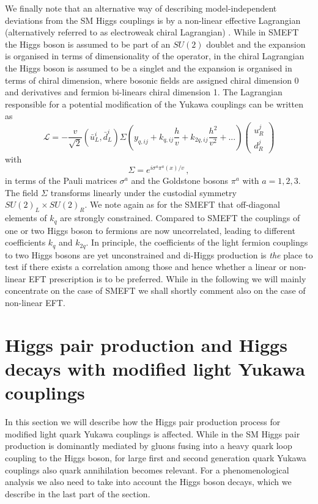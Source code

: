 \par
We finally note that an alternative way of describing model-independent deviations from the SM Higgs couplings is by a non-linear effective Lagrangian (alternatively referred to as electroweak chiral Lagrangian) \cite{Coleman:1969sm, Callan:1969sn}.  While in SMEFT the Higgs boson is assumed to be part of an $SU(2)$ doublet and the expansion is
organised in terms of dimensionality of the operator, in the chiral Lagrangian the Higgs boson is assumed to be a singlet and the expansion is organised in terms
of chiral dimension, where bosonic fields are assigned chiral dimension 0 and derivatives and fermion bi-linears chiral dimension 1.
The Lagrangian responsible for a potential modification of the Yukawa couplings can be written as \cite{Contino:2010mh}
\begin{equation}
	\mathcal{L}=-\frac{v}{\sqrt{2}}(\bar{u}_L^i, \bar{d}_L^i)\Sigma \left( y_{q,ij}+ k_{q,ij} \frac{h}{v}+k_{2q,ij}\frac{h^2}{v^2}+...\right)\left(\begin{array}{c} u_R^j \\ d_R^j\end{array}\right)
	\label{chirallag}
\end{equation}
with
\begin{equation}
	\Sigma=e^{i\sigma^a \pi^a(x)/v}\,,
\end{equation}
in terms of the Pauli matrices $\sigma^a$ and the Goldstone bosons $\pi^a$ with $a=1,2,3$. The field $\Sigma$ transforms linearly under the custodial symmetry $SU(2)_L\times SU(2)_R$. We note again as for the SMEFT that off-diagonal elements of $k_{q}$ are strongly constrained. Compared to SMEFT the couplings of one or two Higgs boson to fermions are now uncorrelated, leading to different coefficients $k_{q}$ and $k_{2q}$.
In principle, the coefficients of the light fermion couplings to two Higgs bosons are yet unconstrained and di-Higgs production is \textit{the} place to test if there exists a correlation among those and hence whether a linear or non-linear EFT prescription is to be preferred.
While in the following we will mainly concentrate on the case of SMEFT we shall shortly comment also on the case of non-linear EFT.
\section{Higgs pair production and Higgs decays with modified light Yukawa couplings \label{sec:HH}}
In this section we will describe how the Higgs pair production process for modified light quark Yukawa couplings is affected.
While in the SM Higgs pair production is dominantly mediated by gluons fusing into a heavy quark loop coupling to the Higgs boson, for large first and second generation quark Yukawa couplings
also quark annihilation becomes relevant.
For a phenomenological analysis we also need to take into account the Higgs boson decays, which we describe in the last part of the section.
